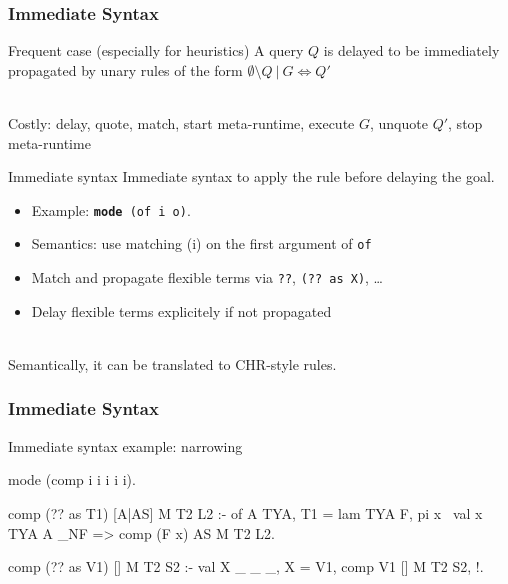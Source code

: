 \documentclass{beamer}
\newcommand{\aapprox}{$\approx$}
\newcommand{\llambda}{$\lambda$}
\newcommand{\bbeta}{$\beta$}
\begin{document}
\begin{frame}[fragile]
 \frametitle{Immediate Syntax}
{\small
 \begin{block}{Frequent case (especially for heuristics)}
  A query $Q$ is delayed to be immediately propagated by unary rules of the
  form \alert{$\emptyset \setminus Q~|~ G \Leftrightarrow Q'$}

  ~\\Costly: delay, quote, match, start meta-runtime, execute $G$, unquote $Q'$, stop meta-runtime
 \end{block}

 \begin{block}{Immediate syntax}
  \alert{Immediate syntax} to apply the rule \alert{before} delaying the goal.
  \begin{itemize}
   \item Example: \texttt{\textbf{mode} (of i o)}.
   \item Semantics: use \alert{matching (i)} on the first argument of \texttt{of}
   \item Match and propagate flexible terms via \texttt{??}, \texttt{(?? as X)}, \ldots
   \item Delay flexible terms explicitely if not propagated
  \end{itemize}

  ~\\ \alert{Semantically, it can be translated to CHR-style rules.}
 \end{block}}
\end{frame}

\begin{frame}[fragile]
 \frametitle{Immediate Syntax}
 \begin{block}{Immediate syntax example: narrowing}
{\small \begin{semiverbatim}
\alert{mode (comp i i i i i).}

\alert{comp (?? as T1) [A|AS] M T2 L2 :-
 of A TYA,
 T1 = lam TYA F,
 pi x \ val x TYA A _NF => comp (F x) AS M T2 L2.}

\alert{comp (?? as V1) [] M T2 S2 :-
 val X _ _ _,
 X = V1,
 comp V1 [] M T2 S2, !.}
\end{semiverbatim}}
 \end{block}
\end{frame}
\end{document}
